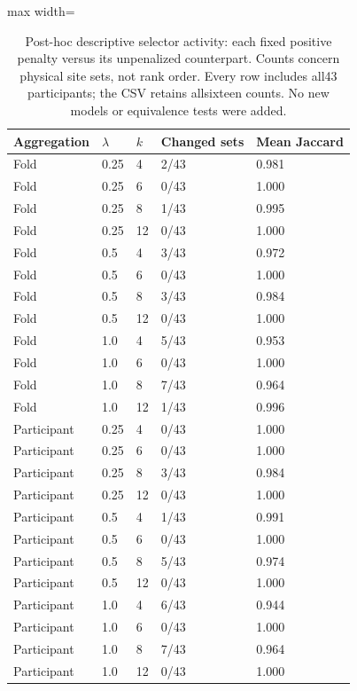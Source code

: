 \begin{table}[htbp]
\centering\small
\caption{Post-hoc descriptive selector activity: each fixed positive penalty versus its unpenalized counterpart. Counts concern physical site sets, not rank order. Every row includes all43 participants; the CSV retains allsixteen counts. No new models or equivalence tests were added.}\label{tab:selectionchanges}
\begin{adjustbox}{max width=\textwidth}
\begin{tabular}{lllll}\toprule
Aggregation & $\lambda$ & $k$ & Changed sets & Mean Jaccard\\\midrule
Fold & 0.25 & 4 & 2/43 & 0.981\\
Fold & 0.25 & 6 & 0/43 & 1.000\\
Fold & 0.25 & 8 & 1/43 & 0.995\\
Fold & 0.25 & 12 & 0/43 & 1.000\\
Fold & 0.5 & 4 & 3/43 & 0.972\\
Fold & 0.5 & 6 & 0/43 & 1.000\\
Fold & 0.5 & 8 & 3/43 & 0.984\\
Fold & 0.5 & 12 & 0/43 & 1.000\\
Fold & 1.0 & 4 & 5/43 & 0.953\\
Fold & 1.0 & 6 & 0/43 & 1.000\\
Fold & 1.0 & 8 & 7/43 & 0.964\\
Fold & 1.0 & 12 & 1/43 & 0.996\\
Participant & 0.25 & 4 & 0/43 & 1.000\\
Participant & 0.25 & 6 & 0/43 & 1.000\\
Participant & 0.25 & 8 & 3/43 & 0.984\\
Participant & 0.25 & 12 & 0/43 & 1.000\\
Participant & 0.5 & 4 & 1/43 & 0.991\\
Participant & 0.5 & 6 & 0/43 & 1.000\\
Participant & 0.5 & 8 & 5/43 & 0.974\\
Participant & 0.5 & 12 & 0/43 & 1.000\\
Participant & 1.0 & 4 & 6/43 & 0.944\\
Participant & 1.0 & 6 & 0/43 & 1.000\\
Participant & 1.0 & 8 & 7/43 & 0.964\\
Participant & 1.0 & 12 & 0/43 & 1.000\\
\bottomrule\end{tabular}
\end{adjustbox}
\end{table}
